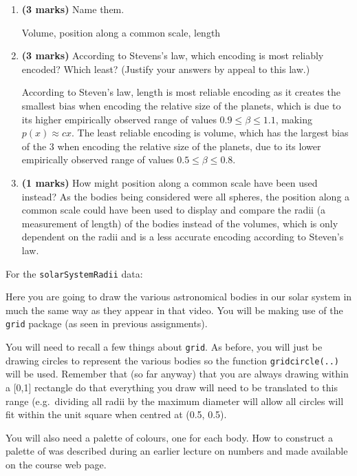 \documentclass[9pt,letter]{article}
\newcommand{\benum}{\begin{enumerate}}
\newcommand{\eenum}{\end{enumerate}}
\begin{document}
\benum
\item \textbf{(3 marks)} Name them.

Volume, position along a common scale, length

\item 

\textbf{(3 marks)} According to Stevens's law, which encoding is most
reliably encoded? Which least? (Justify your answers by appeal to this
law.)

According to Steven's law, length is most reliable encoding as it
creates the smallest bias when encoding the relative size of the
planets, which is due to its higher empirically observed range of values
\(0.9 \le \beta \le 1.1\), making \(p(x) \approx cx\). The least
reliable encoding is volume, which has the largest bias of the 3 when
encoding the relative size of the planets, due to its lower empirically
observed range of values \(0.5 \le \beta \le 0.8\).

\item 

\textbf{(1 marks)} How might position along a common scale have been
used instead? As the bodies being considered were all spheres, the
position along a common scale could have been used to display and
compare the radii (a measurement of length) of the bodies instead of the
volumes, which is only dependent on the radii and is a less accurate
encoding according to Steven's law.

\eenum

\item 

For the \texttt{solarSystemRadii} data:

Here you are going to draw the various astronomical bodies in our solar
system in much the same way as they appear in that video. You will be
making use of the \texttt{grid} package (as seen in previous
assignments).

You will need to recall a few things about \texttt{grid}. As before, you
will just be drawing circles to represent the various bodies so the
function \texttt{gridcircle(..)} will be used. Remember that (so far
anyway) that you are always drawing within a {[}0,1{]} rectangle do that
everything you draw will need to be translated to this range
(e.g.~dividing all radii by the maximum diameter will allow all circles
will fit within the unit square when centred at (0.5, 0.5).

You will also need a palette of colours, one for each body. How to
construct a palette of was described during an earlier lecture on
numbers and made available on the course web page.
\end{document}
